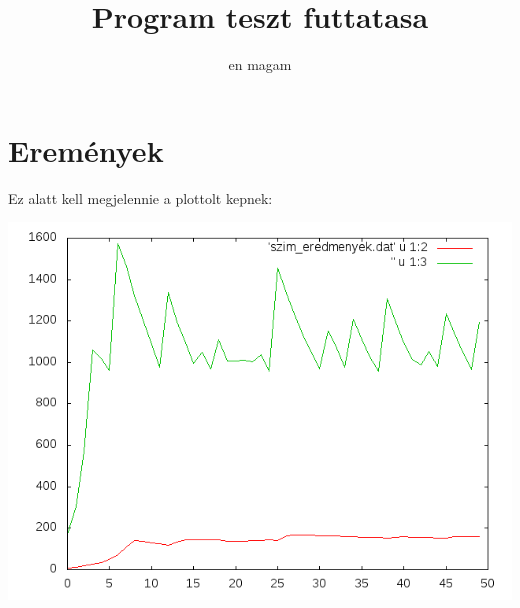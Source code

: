 \documentclass[]{article}
\title{Program teszt futtatasa}
\author{en magam}
\begin{document}
\section{Eremények}
	\par Ez alatt kell megjelennie a plottolt kepnek:	
	\par
	\includegraphics{../build/eredmenyek.png}
\end{document}
